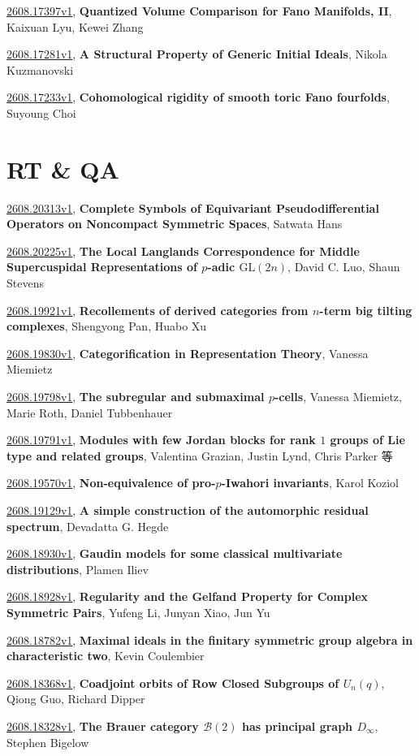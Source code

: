 \documentclass[9pt, a4paper]{article}
\theoremstyle{plain}
\theoremstyle{definition}
\theoremstyle{remark}
\newcommand{\arxiv}[3]{\href{https://arxiv.org/abs/#1}{#1}, \textbf{\textcolor{arxivblue}{#2}}, #3}
\begin{document}
\arxiv{2608.17397v1}{Quantized Volume Comparison for Fano Manifolds, II}{Kaixuan Lyu, Kewei Zhang}

\arxiv{2608.17281v1}{A Structural Property of Generic Initial Ideals}{Nikola Kuzmanovski}

\arxiv{2608.17233v1}{Cohomological rigidity of smooth toric Fano fourfolds}{Suyoung Choi}


\section{RT \& QA}
\arxiv{2608.20313v1}{Complete Symbols of Equivariant Pseudodifferential Operators on Noncompact Symmetric Spaces}{Satwata Hans}

\arxiv{2608.20225v1}{The Local Langlands Correspondence for Middle Supercuspidal Representations of $p$-adic $\text{GL}(2n)$}{David C. Luo, Shaun Stevens}

\arxiv{2608.19921v1}{Recollements of derived categories from $n$-term big tilting complexes}{Shengyong Pan, Huabo Xu}

\arxiv{2608.19830v1}{Categorification in Representation Theory}{Vanessa Miemietz}

\arxiv{2608.19798v1}{The subregular and submaximal $p$-cells}{Vanessa Miemietz, Marie Roth, Daniel Tubbenhauer}

\arxiv{2608.19791v1}{Modules with few Jordan blocks for rank $1$ groups of Lie type and related groups}{Valentina Grazian, Justin Lynd, Chris Parker 等}

\arxiv{2608.19570v1}{Non-equivalence of pro-$p$-Iwahori invariants}{Karol Koziol}

\arxiv{2608.19129v1}{A simple construction of the automorphic residual spectrum}{Devadatta G. Hegde}

\arxiv{2608.18930v1}{Gaudin models for some classical multivariate distributions}{Plamen Iliev}

\arxiv{2608.18928v1}{Regularity and the Gelfand Property for Complex Symmetric Pairs}{Yufeng Li, Junyan Xiao, Jun Yu}

\arxiv{2608.18782v1}{Maximal ideals in the finitary symmetric group algebra in characteristic two}{Kevin Coulembier}

\arxiv{2608.18368v1}{Coadjoint orbits of Row Closed Subgroups of $U_n(q)$}{Qiong Guo, Richard Dipper}

\arxiv{2608.18328v1}{The Brauer category $\mathcal{B}(2)$ has principal graph $D_\infty$}{Stephen Bigelow}
\end{document}
